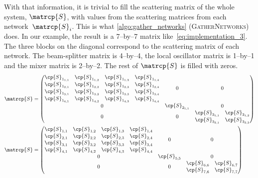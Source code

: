 With that information, it is trivial to fill the scattering matrix of the whole system, $\matrcp{S}$, with values from the scattering matrices from each network~$\matrcp{S}_i$.
This is what \cref{algo:gather_networks} (\textsc{GatherNetworks}) does.
In our example, the result is a 7--by--7 matrix like~\cref{eq:implementation_3}.
The three blocks on the diagonal correspond to the scattering matrix of each network.
The beam-splitter matrix is 4--by--4, the local oscillator matrix is 1--by--1 and the mixer matrix is 2--by--2.
The rest of $\matrcp{S}$ is filled with zeros.
\begin{align}
    \matrcp{S}
    &=
    \begin{pmatrix}
        \begin{matrix}
            \cp{S}_{1_{1,1}} & \cp{S}_{1_{1,2}} & \cp{S}_{1_{1,3}} & \cp{S}_{1_{1,4}} \\
            \cp{S}_{1_{2,1}} & \cp{S}_{1_{2,2}} & \cp{S}_{1_{2,3}} & \cp{S}_{1_{2,4}} \\
            \cp{S}_{1_{3,1}} & \cp{S}_{1_{3,2}} & \cp{S}_{1_{3,3}} & \cp{S}_{1_{3,4}} \\
            \cp{S}_{1_{4,1}} & \cp{S}_{1_{4,2}} & \cp{S}_{1_{4,3}} & \cp{S}_{1_{4,4}}
        \end{matrix}
        & 0 & 0
        \\
        0 &
        \begin{matrix}
            \cp{S}_{2_{1,1}}
        \end{matrix}
        & 0
        \\
        0&0&
        \begin{matrix}
            \cp{S}_{3_{1,1}} & \cp{S}_{3_{1,2}}\\
            \cp{S}_{3_{2,1}} & \cp{S}_{3_{2,2}}
        \end{matrix}
    \end{pmatrix}
    \\
    \matrcp{S}
    &=
    \begin{pmatrix}
        \begin{matrix}
            \cp{S}_{1,1} & \cp{S}_{1,2} & \cp{S}_{1,3} & \cp{S}_{1,4} \\
            \cp{S}_{2,1} & \cp{S}_{2,2} & \cp{S}_{2,3} & \cp{S}_{2,4} \\
            \cp{S}_{3,1} & \cp{S}_{3,2} & \cp{S}_{3,3} & \cp{S}_{3,4} \\
            \cp{S}_{4,1} & \cp{S}_{4,2} & \cp{S}_{4,3} & \cp{S}_{4,4}
        \end{matrix}
        & 0 & 0
        \\
        0 &
        \begin{matrix}
            \cp{S}_{5,5}
        \end{matrix}
        & 0
        \\
        0&0&
        \begin{matrix}
            \cp{S}_{6,6} & \cp{S}_{6,7}\\
            \cp{S}_{7,6} & \cp{S}_{7,7}
        \end{matrix}
    \end{pmatrix}
    \label{eq:implementation_3}
\end{align}

